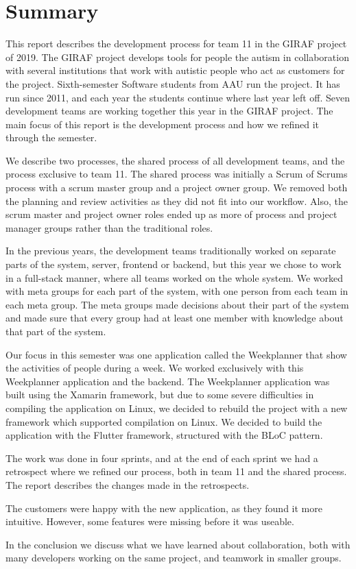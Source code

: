 \section{Summary}

This report describes the development process for team 11 in the GIRAF project of 2019. The GIRAF project develops tools for people the autism in collaboration with several institutions that work with autistic people who act as customers for the project. Sixth-semester Software students from AAU run the project. It has run since 2011, and each year the students continue where last year left off. Seven development teams are working together this year in the GIRAF project. The main focus of this report is the development process and how we refined it through the semester.

We describe two processes, the shared process of all development teams, and the process exclusive to team 11. The shared process was initially a Scrum of Scrums process with a scrum master group and a project owner group. We removed both the planning and review activities as they did not fit into our workflow. Also, the scrum master and project owner roles ended up as more of process and project manager groups rather than the traditional roles. 

In the previous years, the development teams traditionally worked on separate parts of the system, server, frontend or backend, but this year we chose to work in a full-stack manner, where all teams worked on the whole system. We worked with meta groups for each part of the system, with one person from each team in each meta group. The meta groups made decisions about their part of the system and made sure that every group had at least one member with knowledge about that part of the system. 

Our focus in this semester was one application called the Weekplanner that show the activities of people during a week. We worked exclusively with this Weekplanner application and the backend. The Weekplanner application was built using the Xamarin framework, but due to some severe difficulties in compiling the application on Linux, we decided to rebuild the project with a new framework which supported compilation on Linux. We decided to build the application with the Flutter framework, structured with the BLoC pattern. 

The work was done in four sprints, and at the end of each sprint we had a retrospect where we refined our process, both in team 11 and the shared process. The report describes the changes made in the retrospects.

The customers were happy with the new application, as they found it more intuitive. However, some features were missing before it was useable. 

In the conclusion we discuss what we have learned about collaboration, both with many developers working on the same project, and teamwork in smaller groups. 
